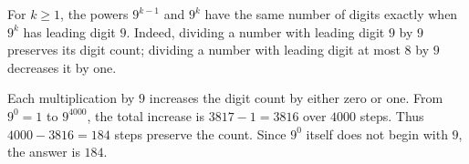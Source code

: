 For $k\ge1$, the powers $9^{k-1}$ and $9^k$ have the same number of digits exactly when $9^k$ has leading digit $9$. Indeed, dividing a number with leading digit $9$ by $9$ preserves its digit count; dividing a number with leading digit at most $8$ by $9$ decreases it by one.

Each multiplication by $9$ increases the digit count by either zero or one. From $9^0=1$ to $9^{4000}$, the total increase is $3817-1=3816$ over $4000$ steps. Thus $4000-3816=184$ steps preserve the count. Since $9^0$ itself does not begin with $9$, the answer is $\boxed{184}$.
